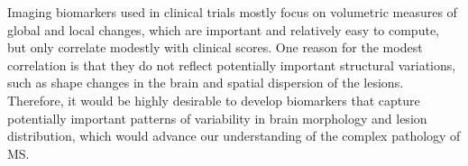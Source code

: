Imaging biomarkers used in clinical trials mostly focus on volumetric measures
of global and local changes, which are important and relatively easy to compute,
but only correlate modestly with clinical scores. One reason for the modest
correlation is that they do not reflect potentially important structural
variations, such as shape changes in the brain and spatial dispersion of the
lesions. Therefore, it would be highly desirable to develop biomarkers that
capture potentially important patterns of variability in brain morphology and
lesion distribution, which would advance our understanding of the complex
pathology of MS.

%
% 
% 
% 
% 
% 

